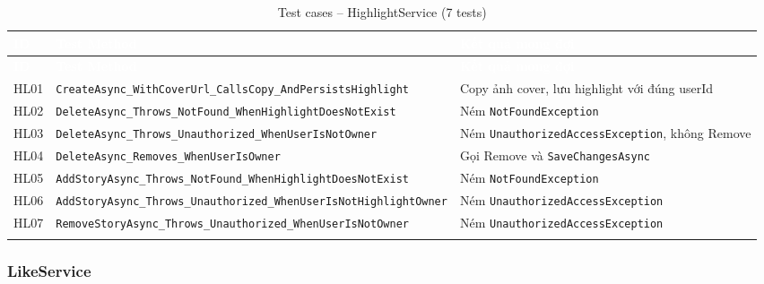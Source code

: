 \documentclass[a4paper]{article}
\begin{document}
\begin{longtable}{|C{0.8cm}|L{5.4cm}|L{7.4cm}|}
\hline
{}
\textcolor{white}{\textbf{ID}} &
\textcolor{white}{\textbf{Test Method}} &
\textcolor{white}{\textbf{Kết quả mong đợi}} \\
\hline
\endfirsthead
\hline
{}
\textcolor{white}{\textbf{ID}} &
\textcolor{white}{\textbf{Test Method}} &
\textcolor{white}{\textbf{Kết quả mong đợi}} \\
\hline
\endhead
\hline
\endfoot

HL01 & \texttt{CreateAsync\_WithCoverUrl\_CallsCopy\_AndPersistsHighlight} & Copy ảnh cover, lưu highlight với đúng userId \\
\hline
HL02 & \texttt{DeleteAsync\_Throws\_NotFound\_WhenHighlightDoesNotExist} & Ném \texttt{NotFoundException} \\
\hline
{}
HL03 & \texttt{DeleteAsync\_Throws\_Unauthorized\_WhenUserIsNotOwner} & Ném \texttt{UnauthorizedAccessException}, không Remove \\
\hline
HL04 & \texttt{DeleteAsync\_Removes\_WhenUserIsOwner} & Gọi Remove và \texttt{SaveChangesAsync} \\
\hline
{}
HL05 & \texttt{AddStoryAsync\_Throws\_NotFound\_WhenHighlightDoesNotExist} & Ném \texttt{NotFoundException} \\
\hline
HL06 & \texttt{AddStoryAsync\_Throws\_Unauthorized\_WhenUserIsNotHighlightOwner} & Ném \texttt{UnauthorizedAccessException} \\
\hline
{}
HL07 & \texttt{RemoveStoryAsync\_Throws\_Unauthorized\_WhenUserIsNotOwner} & Ném \texttt{UnauthorizedAccessException} \\
\hline
\caption{Test cases -- HighlightService (7 tests)}
\end{longtable}

\subsubsection{LikeService}
\end{document}
